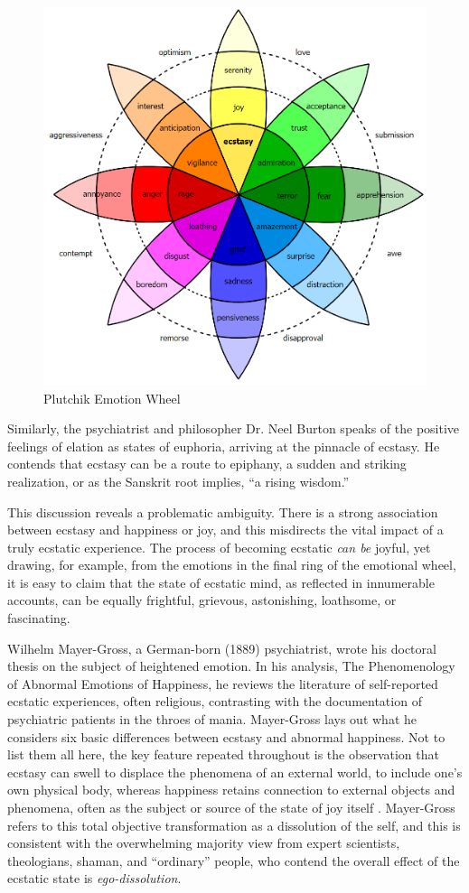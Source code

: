 \documentclass{UIdahoMastersThesis}
\begin{document}
\begin{figure}[h!]
	\centering
	\includegraphics[width=0.72\linewidth]{plutchik_wheel.png}
	\caption{Plutchik Emotion Wheel}
	\label{fig:wheel}
\end{figure}

Similarly, the psychiatrist and philosopher Dr. Neel Burton speaks of the positive feelings of elation as states of euphoria, arriving at the pinnacle of ecstasy. He contends that ecstasy can be a route to epiphany, a sudden and striking realization, or as the Sanskrit root implies, ``a rising wisdom\cite{burton_heaven_2015}.''

This discussion reveals a problematic ambiguity. There is a strong association between ecstasy and happiness or joy, and this misdirects the vital impact of a truly ecstatic experience. The process of becoming ecstatic \emph{can be} joyful, yet drawing, for example, from the emotions in the final ring of the emotional wheel, it is easy to claim that the state of ecstatic mind, as reflected in innumerable accounts, can be equally frightful, grievous, astonishing, loathsome, or fascinating.

Wilhelm Mayer-Gross, a German-born (1889) psychiatrist, wrote his doctoral thesis on the subject of heightened emotion. In his analysis, The Phenomenology of Abnormal Emotions of Happiness, he reviews the literature of self-reported ecstatic experiences, often religious, contrasting with the documentation of psychiatric patients in the throes of mania\cite{mayer-gross_translation:_nodate}.  Mayer-Gross lays out what he considers six basic differences between ecstasy and abnormal happiness. Not to list them all here, the key feature repeated throughout is the observation that ecstasy can swell to displace the phenomena of an external world, to include one's own physical body, whereas happiness retains connection to external objects and phenomena, often as the subject or source of the state of joy itself \cite{beer_nature_2000} . Mayer-Gross refers to this total objective transformation as a dissolution of the self, and this is consistent with the overwhelming majority view from expert scientists, theologians, shaman, and ``ordinary'' people, who contend the overall effect of the ecstatic state is \emph{ego-dissolution}.
\end{document}
